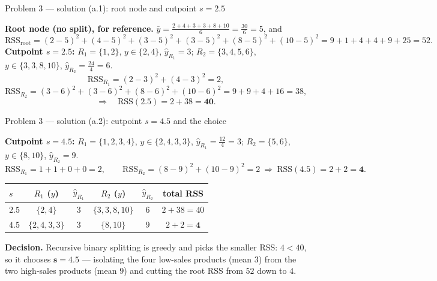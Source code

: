 \documentclass[aspectratio=169,11pt]{beamer}
\begin{document}
\begin{frame}{Problem 3 --- solution (a.1): root node and cutpoint $s=2.5$}
  \begin{solutionbox}
    \textbf{Root node (no split), for reference.}
    $\bar y=\tfrac{2+4+3+3+8+10}{6}=\tfrac{30}{6}=5$, and
    \[
      \mathrm{RSS}_{\text{root}}=(2{-}5)^2+(4{-}5)^2+(3{-}5)^2+(3{-}5)^2+(8{-}5)^2+(10{-}5)^2
      =9{+}1{+}4{+}4{+}9{+}25=52 .
    \]
    \textbf{Cutpoint $s=2.5$:} $R_1=\{1,2\}$, $y\in\{2,4\}$, $\hat y_{R_1}=3$;\quad
    $R_2=\{3,4,5,6\}$, $y\in\{3,3,8,10\}$, $\hat y_{R_2}=\tfrac{24}{4}=6$.
    \[
      \mathrm{RSS}_{R_1}=(2{-}3)^2+(4{-}3)^2=2,
    \]
    \[
      \mathrm{RSS}_{R_2}=(3{-}6)^2+(3{-}6)^2+(8{-}6)^2+(10{-}6)^2=9{+}9{+}4{+}16=38,
    \]
    \[
      \Longrightarrow\quad \mathrm{RSS}(2.5)=2+38=\mathbf{40}.
    \]
  \end{solutionbox}
\end{frame}

\begin{frame}{Problem 3 --- solution (a.2): cutpoint $s=4.5$ and the choice}
  \begin{solutionbox}
    \textbf{Cutpoint $s=4.5$:} $R_1=\{1,2,3,4\}$, $y\in\{2,4,3,3\}$, $\hat y_{R_1}=\tfrac{12}{4}=3$;\quad
    $R_2=\{5,6\}$, $y\in\{8,10\}$, $\hat y_{R_2}=9$.
    \[
      \mathrm{RSS}_{R_1}=1+1+0+0=2,\qquad
      \mathrm{RSS}_{R_2}=(8{-}9)^2+(10{-}9)^2=2
      \ \Rightarrow\ \mathrm{RSS}(4.5)=2+2=\mathbf{4}.
    \]
    \begin{center}\scriptsize
    \begin{tabular}{lccccc}
      \toprule
      $s$ & $R_1$ ($y$) & $\hat y_{R_1}$ & $R_2$ ($y$) & $\hat y_{R_2}$ & total RSS\\
      \midrule
      $2.5$ & $\{2,4\}$ & $3$ & $\{3,3,8,10\}$ & $6$ & $2+38=40$\\
      $4.5$ & $\{2,4,3,3\}$ & $3$ & $\{8,10\}$ & $9$ & $2+2=\mathbf{4}$\\
      \bottomrule
    \end{tabular}
    \end{center}
    \textbf{Decision.} Recursive binary splitting is greedy and picks the smaller RSS: $4<40$, so
    it chooses $\mathbf{s=4.5}$ --- isolating the four low-sales products (mean $3$) from the two
    high-sales products (mean $9$) and cutting the root RSS from $52$ down to $4$.
  \end{solutionbox}
\end{frame}
\end{document}
